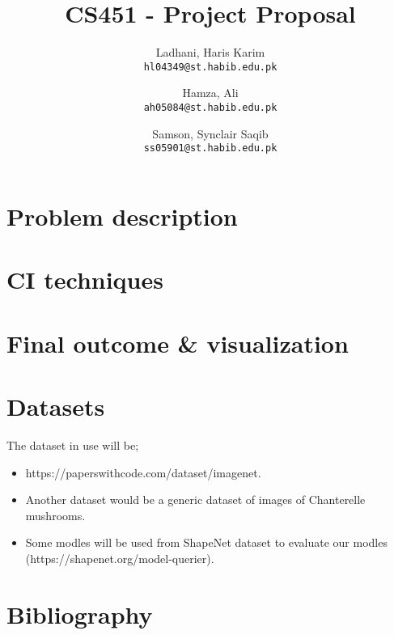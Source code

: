 \documentclass[11pt,letterpaper]{article}
\begin{document}
\title{CS451 - Project Proposal}
\author{Ladhani, Haris Karim\\
\texttt{hl04349@st.habib.edu.pk}
\and
Hamza, Ali\\
\texttt{ah05084@st.habib.edu.pk}
\and
Samson, Synclair Saqib\\
\texttt{ss05901@st.habib.edu.pk}
}
\maketitle


\section*{Problem description}


\section*{CI techniques}


\section*{Final outcome \& visualization}


\section*{Datasets} 
The dataset in use will be;
\begin{itemize}
    \item https://paperswithcode.com/dataset/imagenet.
    \item Another dataset would be a generic dataset of images of Chanterelle mushrooms.
    \item Some modles will be used from ShapeNet dataset to evaluate our modles (https://shapenet.org/model-querier).
\end{itemize}

\section*{Bibliography}

  
\end{document}
